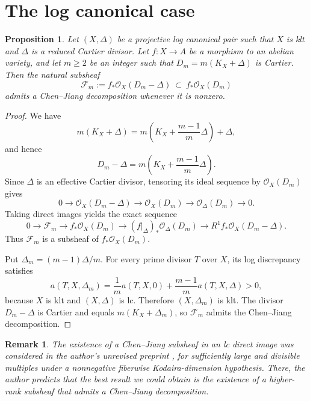 \documentclass[11pt,letterpaper]{article}
\theoremstyle{paper}
\newtheorem{proposition}[theorem]{Proposition}
\newtheorem{remark}[theorem]{Remark}
\newcommand{\OO}{\mathcal O}
\newcommand{\FF}{\mathcal F}
\begin{document}
\section{The log canonical case}
\begin{proposition}\label{prop:subsheaf}
Let $(X,\Delta)$ be a projective log canonical pair such that $X$ is klt and $\Delta$ is a reduced Cartier divisor. Let $f:X\to A$ be a morphism to an abelian variety, and let $m\ge2$ be an integer such that $D_m=m(K_X+\Delta)$ is Cartier. Then the natural subsheaf
\[
\FF_m:=f_*\OO_X(D_m-\Delta)\ \subset\ f_*\OO_X(D_m)
\]
admits a Chen--Jiang decomposition whenever it is nonzero.
\end{proposition}
\begin{proof}
We have
\[
m(K_X+\Delta)=m\left(K_X+\frac{m-1}{m}\Delta\right)+\Delta,
\]
and hence
\[
D_m-\Delta=m\left(K_X+\frac{m-1}{m}\Delta\right).
\]
Since $\Delta$ is an effective Cartier divisor, tensoring its ideal sequence by $\OO_X(D_m)$ gives
\begin{equation}\label{eq:boundarysequence}
0\longrightarrow\OO_X(D_m-\Delta)\longrightarrow\OO_X(D_m)
\longrightarrow\OO_\Delta(D_m)\longrightarrow0.
\end{equation}
Taking direct images yields the exact sequence
\[
0\longrightarrow\FF_m\longrightarrow f_*\OO_X(D_m)
\longrightarrow(f|_\Delta)_*\OO_\Delta(D_m)
\longrightarrow R^1f_*\OO_X(D_m-\Delta).
\]
Thus $\FF_m$ is a subsheaf of $f_*\OO_X(D_m)$.

Put $\Delta_m=(m-1)\Delta/m$. For every prime divisor $T$ over $X$, its log discrepancy satisfies
\[
a(T,X,\Delta_m)=\frac1m a(T,X,0)+\frac{m-1}{m}a(T,X,\Delta)>0,
\]
because $X$ is klt and $(X,\Delta)$ is lc. Therefore $(X,\Delta_m)$ is klt. The divisor $D_m-\Delta$ is Cartier and equals $m(K_X+\Delta_m)$, so $\FF_m$ admits the Chen--Jiang decomposition.
\end{proof}

\begin{remark}\label{rem:ammarsubsheaf}
The existence of a Chen--Jiang subsheaf in an lc direct image was considered in the author's unrevised preprint \cite[Proposition 1.4]{Ammar}, for sufficiently large and divisible multiples under a nonnegative fiberwise Kodaira-dimension hypothesis. There, the author predicts that the best result we could obtain is the existence of a higher-rank subsheaf that admits a Chen--Jiang decomposition.
\end{remark}
\end{document}
